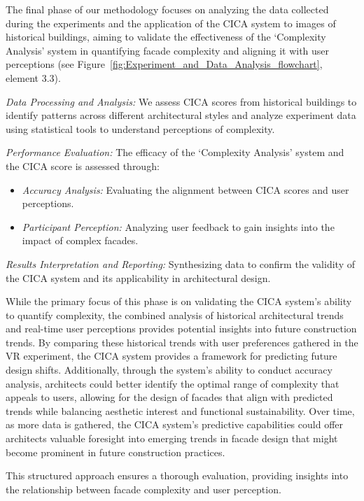 %    

The final phase of our methodology focuses on analyzing the data collected during the experiments and the application of the CICA system to images of historical buildings, aiming to validate the effectiveness of the `Complexity Analysis' system in quantifying facade complexity and aligning it with user perceptions (see Figure~\ref{fig:Experiment_and_Data_Analysis_flowchart}, element 3.3).

\textit{Data Processing and Analysis:} We assess CICA scores from historical buildings to identify patterns across different architectural styles and analyze experiment data using statistical tools to understand perceptions of complexity.

\textit{Performance Evaluation:} The efficacy of the `Complexity Analysis' system and the CICA score is assessed through:
\begin{itemize}
    \item \textit{Accuracy Analysis:} Evaluating the alignment between CICA scores and user perceptions.
    \item \textit{Participant Perception:} Analyzing user feedback to gain insights into the impact of complex facades.
\end{itemize}

\textit{Results Interpretation and Reporting:} Synthesizing data to confirm the validity of the CICA system and its applicability in architectural design.

While the primary focus of this phase is on validating the CICA system’s ability to quantify complexity, the combined analysis of historical architectural trends and real-time user perceptions provides potential insights into future construction trends.
By comparing these historical trends with user preferences gathered in the VR experiment, the CICA system provides a framework for predicting future design shifts.
Additionally, through the system’s ability to conduct accuracy analysis, architects could better identify the optimal range of complexity that appeals to users, allowing for the design of facades that align with predicted trends while balancing aesthetic interest and functional sustainability.
Over time, as more data is gathered, the CICA system's predictive capabilities could offer architects valuable foresight into emerging trends in facade design that might become prominent in future construction practices.

This structured approach ensures a thorough evaluation, providing insights into the relationship between facade complexity and user perception.







